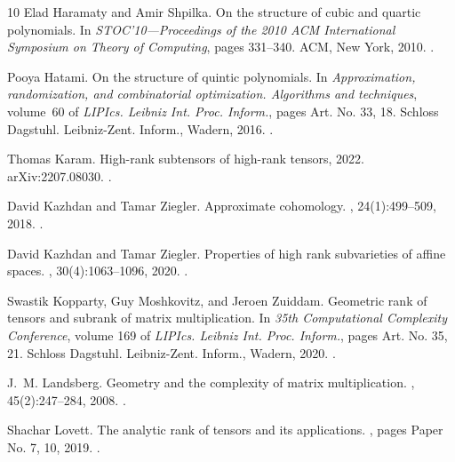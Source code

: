 \begin{thebibliography}{10}
Elad Haramaty and Amir Shpilka.
\newblock On the structure of cubic and quartic polynomials.
\newblock In {\em S{TOC}'10---{P}roceedings of the 2010 {ACM} {I}nternational {S}ymposium on {T}heory of {C}omputing}, pages 331--340. ACM, New York, 2010.
\newblock \href {https://doi.org/10.1145/1806689.1806736} {}.

Pooya Hatami.
\newblock On the structure of quintic polynomials.
\newblock In {\em Approximation, randomization, and combinatorial optimization. {A}lgorithms and techniques}, volume~60 of {\em LIPIcs. Leibniz Int. Proc. Inform.}, pages Art. No. 33, 18. Schloss Dagstuhl. Leibniz-Zent. Inform., Wadern, 2016.
\newblock \href {https://doi.org/10.4230/LIPIcs.APPROX-RANDOM.2016.33} {}.

Thomas Karam.
\newblock High-rank subtensors of high-rank tensors, 2022.
\newblock arXiv:2207.08030.
\newblock \href {https://doi.org/10.48550/ARXIV.2207.08030} {}.

David Kazhdan and Tamar Ziegler.
\newblock Approximate cohomology.
, 24(1):499--509, 2018.
\newblock \href {https://doi.org/10.1007/s00029-017-0335-5} {}.

David Kazhdan and Tamar Ziegler.
\newblock Properties of high rank subvarieties of affine spaces.
, 30(4):1063--1096, 2020.
\newblock \href {https://doi.org/10.1007/s00039-020-00542-4} {}.

Swastik Kopparty, Guy Moshkovitz, and Jeroen Zuiddam.
\newblock Geometric rank of tensors and subrank of matrix multiplication.
\newblock In {\em 35th {C}omputational {C}omplexity {C}onference}, volume 169 of {\em LIPIcs. Leibniz Int. Proc. Inform.}, pages Art. No. 35, 21. Schloss Dagstuhl. Leibniz-Zent. Inform., Wadern, 2020.
\newblock \href {https://doi.org/10.4230/LIPIcs.CCC.2020.35} {}.

J.~M. Landsberg.
\newblock Geometry and the complexity of matrix multiplication.
, 45(2):247--284, 2008.
\newblock \href {https://doi.org/10.1090/S0273-0979-08-01176-2} {}.

Shachar Lovett.
\newblock The analytic rank of tensors and its applications.
, pages Paper No. 7, 10, 2019.
\newblock \href {https://doi.org/10.19086/da} {}.


\end{thebibliography}
